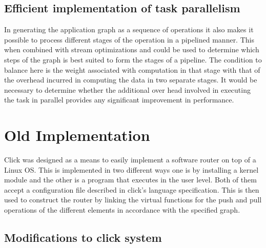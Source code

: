 \documentclass[conference]{IEEEtran}
\begin{document}
\subsection{Efficient implementation of task parallelism}

In generating the application graph as a sequence of operations it also makes it possible to process different stages of the operation in a pipelined manner. This when combined with stream optimizations and could be used to determine which steps of the graph is best suited to form the stages of a pipeline. The condition to balance here is the weight associated with computation in that stage with that of the overhead incurred in computing the data in two separate stages. It would be necessary to determine whether the additional over head involved in executing the task in parallel provides any significant improvement in performance. 

\section{Old Implementation}

Click was designed as a means to easily implement a software router on top of a Linux OS. This is implemented in two different ways one is by installing a kernel module and the other is a program that executes in the user level. Both of them accept a configuration file described in click's language specification. This is then used to construct the router by linking the virtual functions for the push and pull operations of the different elements in accordance with the specified graph.

\subsection{Modifications to click system}
\end{document}
